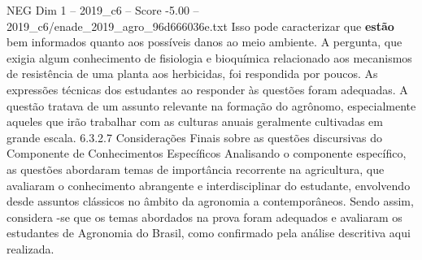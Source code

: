\begin{textsample}{NEG Dim 1 – 2019\_c6 – Score -5.00 – 2019\_c6/enade\_2019\_agro\_96d666036e.txt}
Isso pode caracterizar que \textbf{estão} bem informados quanto aos possíveis danos ao meio ambiente.
A pergunta, que exigia algum conhecimento de fisiologia e bioquímica relacionado aos mecanismos de resistência de uma planta aos herbicidas, foi respondida por poucos.
As expressões técnicas dos estudantes ao responder às questões foram adequadas.
A questão tratava de um assunto relevante na formação do agrônomo, especialmente aqueles que irão trabalhar com as culturas anuais geralmente cultivadas em grande escala. 6.3.2.7 Considerações Finais sobre as questões discursivas do Componente de Conhecimentos Específicos Analisando o componente específico, as questões abordaram temas de importância recorrente na agricultura, que avaliaram o conhecimento abrangente e interdisciplinar do estudante, envolvendo desde assuntos clássicos no âmbito da agronomia a contemporâneos.
Sendo assim, considera -se que os temas abordados na prova foram adequados e avaliaram os estudantes de Agronomia do Brasil, como confirmado pela análise descritiva aqui realizada.

\end{textsample}
